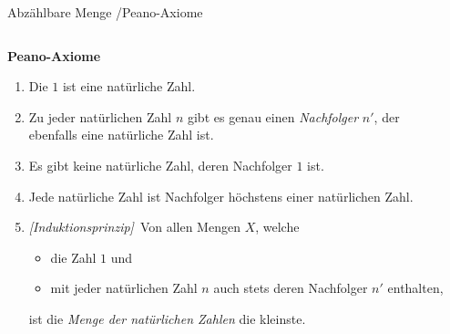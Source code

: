 \documentclass[12pt,ngerman,a4paper,ignorenonframetext,]{beamer}
\begin{document}
\begin{frame}{Abzählbare Menge /\thinspace{}Peano-Axiome}
\protect\hypertarget{abzahlbare-menge-peano-axiome}{}

\begin{columns}[T]
\begin{column}{0.74\textwidth}
{\small{}

\textbf{Peano-Axiome}

\begin{enumerate}[(1)]
    \item   Die $1$ ist eine natürliche Zahl. 
    \item   Zu jeder natürlichen Zahl $n$ gibt es genau 
            einen \textit{Nachfolger} $n'$, der ebenfalls eine 
            natürliche Zahl ist. 
    \item   Es gibt keine natürliche Zahl, deren Nachfolger $1$ ist.
    \item   Jede natürliche Zahl ist Nachfolger höchstens einer 
            natürlichen Zahl. 
    \item   \textit{[Induktionsprinzip]}\, 
            Von allen Mengen $X$, welche 
            \begin{itemize}
                \item   die Zahl $1$ und 
                \item   mit jeder natürlichen Zahl $n$ auch stets 
                        deren Nachfolger $n'$ enthalten, 
            \end{itemize}
            ist die \textit{Menge der natürlichen Zahlen} die kleinste.
\end{enumerate}

}
\end{column}

\begin{column}{0.24\textwidth}
\end{column}
\end{columns}

\end{frame}
\end{document}

